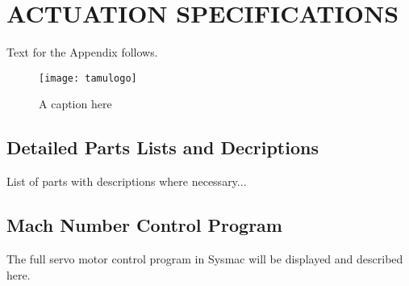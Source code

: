%
%	 
%


\chapter{ACTUATION SPECIFICATIONS}
\label{appendix:actuation}

Text for the Appendix follows.

\begin{figure}[ht]
    \centering
    \texttt{[image: tamulogo]}
    \caption{A caption here}
\end{figure}

\section{Detailed Parts Lists and Decriptions}

List of parts with descriptions where necessary...

\section{Mach Number Control Program}

The full servo motor control program in Sysmac will be displayed and described here.

